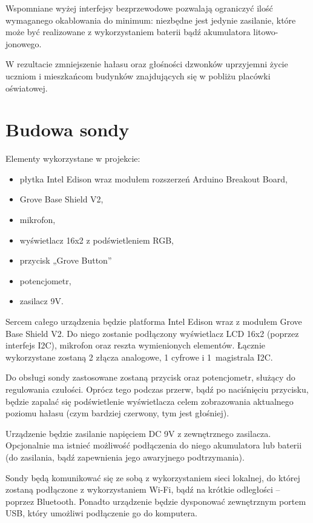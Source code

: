 \documentclass[12pt, a4paper]{article}
\begin{document}
Wspomniane wyżej interfejsy bezprzewodowe pozwalają ograniczyć ilość wymaganego okablowania do minimum: niezbędne jest jedynie zasilanie, które może być realizowane z wykorzystaniem baterii bądź akumulatora litowo-jonowego.

W rezultacie zmniejszenie hałasu oraz głośności dzwonków uprzyjemni życie uczniom i mieszkańcom budynków znajdujących się w pobliżu placówki oświatowej.

\section{Budowa sondy}

Elementy wykorzystane w projekcie:
\begin{itemize}
\item płytka Intel Edison wraz modułem rozszerzeń Arduino Breakout Board,
\item Grove Base Shield V2,
\item mikrofon,
\item wyświetlacz 16x2 z podświetleniem RGB,
\item przycisk „Grove Button”
\item potencjometr,
\item zasilacz 9V.
\end{itemize}

Sercem całego urządzenia będzie platforma Intel Edison wraz z modułem Grove Base Shield V2. Do niego zostanie podłączony wyświetlacz LCD 16x2 (poprzez interfejs I2C), mikrofon oraz reszta wymienionych elementów. Łącznie wykorzystane zostaną 2 złącza analogowe, 1 cyfrowe i 1~magistrala I2C. 

Do obsługi sondy zastosowane zostaną przycisk oraz potencjometr, służący do regulowania czułości. Oprócz tego podczas przerw, bądź po naciśnięciu przycisku, będzie zapalać się podświetlenie wyświetlacza celem zobrazowania aktualnego poziomu hałasu (czym bardziej czerwony, tym jest głośniej).

Urządzenie będzie zasilanie napięciem DC 9V z zewnętrznego zasilacza. Opcjonalnie ma istnieć możliwość podłączenia do niego akumulatora lub baterii (do zasilania, bądź zapewnienia jego awaryjnego podtrzymania).

Sondy będą komunikować się ze sobą z wykorzystaniem sieci lokalnej, do której zostaną podłączone z wykorzystaniem Wi-Fi, bądź na krótkie odległości -- poprzez Bluetooth. Ponadto urządzenie będzie dysponować zewnętrznym portem USB, który umożliwi podłączenie go do komputera.
\end{document}

